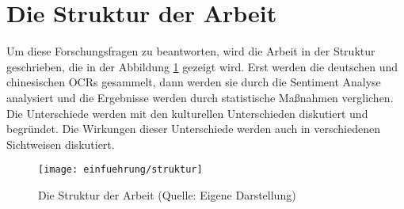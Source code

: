 \section{Die Struktur der Arbeit}
Um diese Forschungsfragen zu beantworten, wird die Arbeit in der Struktur geschrieben, die in der Abbildung \ref{fig:struktur} gezeigt wird. Erst werden die deutschen und chinesischen \ac{OCRs} gesammelt, dann werden sie durch die Sentiment Analyse analysiert und die Ergebnisse werden durch statistische Maßnahmen verglichen. Die Unterschiede werden mit den kulturellen Unterschieden diskutiert und begründet. Die Wirkungen dieser Unterschiede werden auch in verschiedenen Sichtweisen diskutiert.

\begin{figure}[htb]
	\centering
	\texttt{[image: einfuehrung/struktur]}
	\caption[Die Struktur der Arbeit]{Die Struktur der Arbeit (Quelle: Eigene Darstellung)}
	\label{fig:struktur}
\end{figure}

